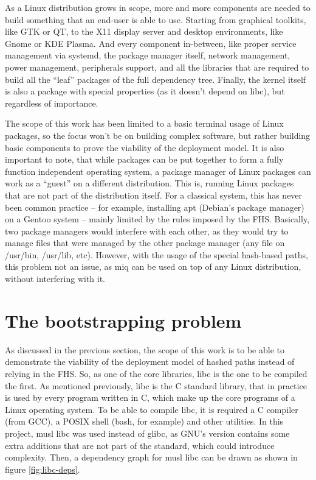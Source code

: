 As a Linux distribution grows in scope, more and more
components are needed to build something that an end-user is
able to use. Starting from graphical toolkits, like GTK or
QT, to the X11 display server and desktop environments, like
Gnome or KDE Plasma. And every component in-between, like
proper service management via systemd, the package manager
itself, network management, power management, peripherals
support, and all the libraries that are required to build
all the ``leaf'' packages of the full dependency tree.
Finally, the kernel itself is also a package with special
properties (as it doesn't depend on libc), but regardless of
importance.

The scope of this work has been limited to a basic terminal
usage of Linux packages, so the focus won't be on building
complex software, but rather building basic components to
prove the viability of the deployment model. It is also
important to note, that while packages can be put together
to form a fully function independent operating system, a
package manager of Linux packages can work as a ``guest'' on
a different distribution. This is, running Linux packages
that are not part of the distribution itself. For a
classical system, this has never been common practice -- for
example, installing apt (Debian's package manager) on a
Gentoo system -- mainly limited by the rules imposed by the
\acl{FHS}. Basically, two package managers would interfere
with each other, as they would try to manage files that were
managed by the other package manager (any file on /usr/bin,
/usr/lib, etc). However, with the usage of the special
hash-based paths, this problem not an issue, as miq can be
used on top of any Linux distribution, without interfering
with it.

\FloatBarrier
\section{The bootstrapping problem}

As discussed in the previous section, the scope of this work
is to be able to demonstrate the viability of the deployment
model of hashed paths instead of relying in the \ac{FHS}.
So, as one of the core libraries, libc is the one to be
compiled the first. As mentioned previously, libc is the C
standard library, that in practice is used by every program
written in C, which make up the core programs of a Linux
operating system. To be able to compile libc, it is required
a C compiler (from GCC), a POSIX shell (bash, for
example) and other utilities. In this project, musl libc was used instead of
glibc, as GNU's version contains some extra additions that
are not part of the standard, which could introduce
complexity. Then, a dependency graph for musl libc can be
drawn as shown in figure \ref{fig:libc-deps}.

